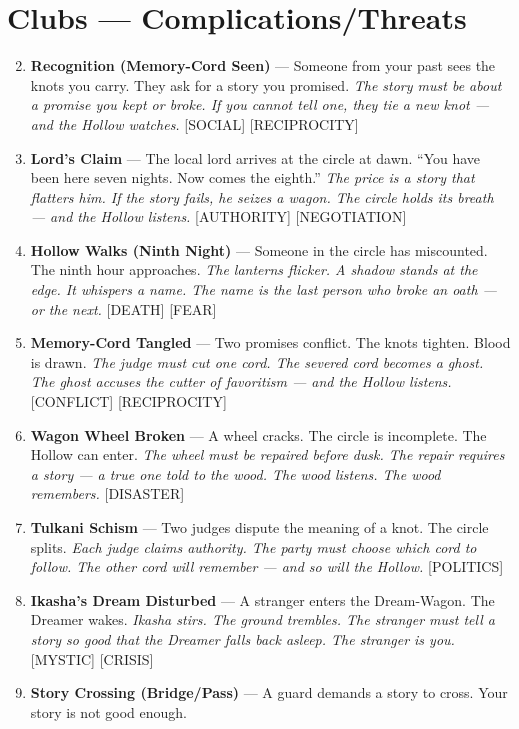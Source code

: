 \section*{Clubs --- Complications/Threats}
\label{sec:tulkani-complications}
\begin{enumerate}
\setcounter{enumi}{1}
\item \textbf{Recognition (Memory-Cord Seen)} --- Someone from your past sees the knots you carry. They ask for a story you promised.
  \hfill \textit{The story must be about a promise you kept or broke. If you cannot tell one, they tie a new knot --- and the Hollow watches.} [SOCIAL] [RECIPROCITY]
\item \textbf{Lord's Claim} --- The local lord arrives at the circle at dawn. ``You have been here seven nights. Now comes the eighth.''
  \hfill \textit{The price is a story that flatters him. If the story fails, he seizes a wagon. The circle holds its breath --- and the Hollow listens.} [AUTHORITY] [NEGOTIATION]
\item \textbf{Hollow Walks (Ninth Night)} --- Someone in the circle has miscounted. The ninth hour approaches.
  \hfill \textit{The lanterns flicker. A shadow stands at the edge. It whispers a name. The name is the last person who broke an oath --- or the next.} [DEATH] [FEAR]
\item \textbf{Memory-Cord Tangled} --- Two promises conflict. The knots tighten. Blood is drawn.
  \hfill \textit{The judge must cut one cord. The severed cord becomes a ghost. The ghost accuses the cutter of favoritism --- and the Hollow listens.} [CONFLICT] [RECIPROCITY]
\item \textbf{Wagon Wheel Broken} --- A wheel cracks. The circle is incomplete. The Hollow can enter.
  \hfill \textit{The wheel must be repaired before dusk. The repair requires a story --- a true one told to the wood. The wood listens. The wood remembers.} [DISASTER]
\item \textbf{Tulkani Schism} --- Two judges dispute the meaning of a knot. The circle splits.
  \hfill \textit{Each judge claims authority. The party must choose which cord to follow. The other cord will remember --- and so will the Hollow.} [POLITICS]
\item \textbf{Ikasha's Dream Disturbed} --- A stranger enters the Dream-Wagon. The Dreamer wakes.
  \hfill \textit{Ikasha stirs. The ground trembles. The stranger must tell a story so good that the Dreamer falls back asleep. The stranger is you.} [MYSTIC] [CRISIS]
\item \textbf{Story Crossing (Bridge/Pass)} --- A guard demands a story to cross. Your story is not good enough.

\end{enumerate}

